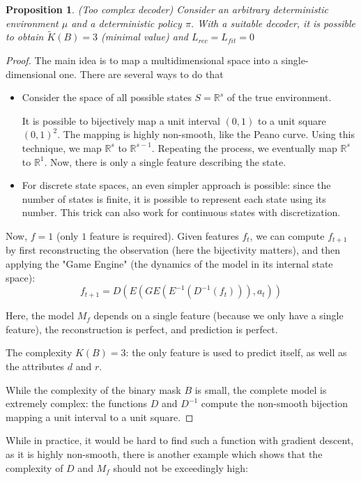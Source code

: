 \documentclass[a4paper,11pt,oneside]{report}
\newtheorem{proposition}{Proposition}[section]
\begin{document}
\begin{proposition}{(Too complex decoder)}
    Consider an arbitrary deterministic environment $\mu$ and a deterministic policy $\pi$. With a suitable decoder, it is possible to obtain $\tilde{K}(B)=3$ (minimal value) and $L_{rec}=L_{fit}=0$
\end{proposition}
\begin{proof}
    The main idea is to map a multidimensional space into a single-dimensional one. There are several ways to do that

    \begin{itemize}
    \item Consider the space of all possible states $S=\mathbb R^s$ of the true environment.

    It is possible to bijectively map a unit interval $(0,1)$ to a unit square $(0,1)^2$. The mapping is highly non-smooth, like the Peano curve.
    Using this technique, we map $\mathbb R^s$ to $\mathbb R^{s-1}$. Repeating the process, we eventually map $\mathbb R^s$ to $\mathbb R^1$. Now, there is only a single feature describing the state.

    \item For discrete state spaces, an even simpler approach is possible: since the number of states is finite, it is possible to represent each state using its number. This trick can also work for continuous states with discretization.
    \end{itemize}

    Now, $f=1$ (only $1$ feature is required). Given features $f_t$, we can compute $f_{t+1}$ by first reconstructing the observation (here the bijectivity matters), and then applying the "Game Engine" (the dynamics of the model in its internal state space):
    $$
    f_{t+1}=D(E(GE(E^{-1}(D^{-1}(f_t))),a_t))
    $$

    Here, the model $M_f$ depends on a single feature (because we only have a single feature), the reconstruction is perfect, and prediction is perfect.

    The complexity $K(B)=3$: the only feature is used to predict itself, as well as the attributes $d$ and $r$.

    While the complexity of the binary mask $B$ is small, the complete model is extremely complex: the functions $D$ and $D^{-1}$ compute the non-smooth bijection mapping a unit interval to a unit square.
\end{proof}

While in practice, it would be hard to find such a function with gradient descent, as it is highly non-smooth, there is another example which shows that the complexity of $D$ and $M_f$ should not be exceedingly high:
\end{document}
